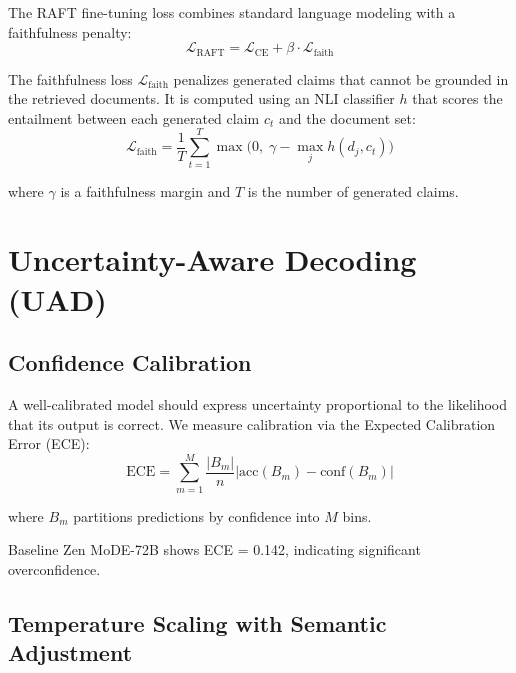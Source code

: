 \documentclass[11pt,a4paper]{article}
\begin{document}
The RAFT fine-tuning loss combines standard language modeling with a faithfulness penalty:
\begin{equation}
    \mathcal{L}_{\text{RAFT}} = \mathcal{L}_{\text{CE}} + \beta \cdot \mathcal{L}_{\text{faith}}
    \label{eq:raft_loss}
\end{equation}

The faithfulness loss $\mathcal{L}_{\text{faith}}$ penalizes generated claims that cannot
be grounded in the retrieved documents. It is computed using an NLI classifier $h$ that
scores the entailment between each generated claim $c_t$ and the document set:
\begin{equation}
    \mathcal{L}_{\text{faith}} = \frac{1}{T}\sum_{t=1}^{T}
    \max\!\bigl(0,\; \gamma - \max_j h(d_j, c_t)\bigr)
    \label{eq:faith_loss}
\end{equation}

where $\gamma$ is a faithfulness margin and $T$ is the number of generated claims.

\section{Uncertainty-Aware Decoding (UAD)}
\label{sec:uad}

\subsection{Confidence Calibration}

A well-calibrated model should express uncertainty proportional to the likelihood that
its output is correct. We measure calibration via the Expected Calibration Error (ECE):
\begin{equation}
    \text{ECE} = \sum_{m=1}^{M} \frac{|B_m|}{n} \left|
    \text{acc}(B_m) - \text{conf}(B_m) \right|
    \label{eq:ece}
\end{equation}

where $B_m$ partitions predictions by confidence into $M$ bins.

Baseline Zen MoDE-72B shows ECE = 0.142, indicating significant overconfidence.

\subsection{Temperature Scaling with Semantic Adjustment}
\end{document}
